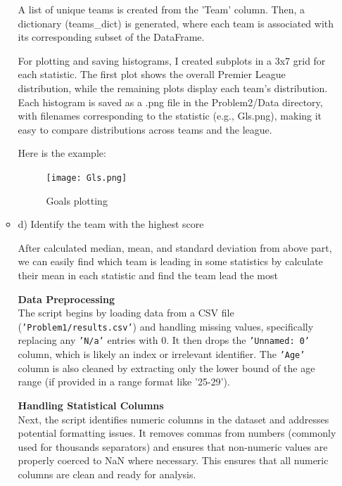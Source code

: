 \documentclass[a4paper,12pt]{article}
\begin{document}
\begin{itemize}[label= {*}, leftmargin= 1cm]
\begin{itemize}[label= {}, leftmargin= 1cm]
        A list of unique teams is created from the 'Team' column. Then, a dictionary (teams\_dict) is generated, where each team is associated with its corresponding subset of the DataFrame.

        For plotting and saving histograms, I created subplots in a 3x7 grid for each statistic. The first plot shows the overall Premier League distribution, while the remaining plots display each team's distribution. Each histogram is saved as a .png file in the Problem2/Data directory, with filenames corresponding to the statistic (e.g., Gls.png), making it easy to compare distributions across teams and the league.
        \vspace{0.3cm}
        
        Here is the example:
        \begin{figure}[h]
            \centering
            \texttt{[image: Gls.png]}
            \caption{Goals plotting}
        \end{figure}
        \newpage        
        
        \item d) Identify the team with the highest score
        \vspace{0.5cm}
        
        After calculated median, mean, and standard deviation from above part, we can easily find which team is leading in some statistics by calculate their mean in each statistic and find the team lead the most 
        \vspace{0.2cm}
        
        \textbf{Data Preprocessing}\\
        The script begins by loading data from a CSV file (\texttt{'Problem1/results.csv'}) and handling missing values, specifically replacing any \texttt{'N/a'} entries with 0. It then drops the \texttt{'Unnamed: 0'} column, which is likely an index or irrelevant identifier. The \texttt{'Age'} column is also cleaned by extracting only the lower bound of the age range (if provided in a range format like '25-29').
        \vspace{0.3cm}
        
        \textbf{Handling Statistical Columns}\\
        Next, the script identifies numeric columns in the dataset and addresses potential formatting issues. It removes commas from numbers (commonly used for thousands separators) and ensures that non-numeric values are properly coerced to NaN where necessary. This ensures that all numeric columns are clean and ready for analysis.
        \vspace{0.3cm}
        

\end{itemize}
\end{itemize}
\end{document}
